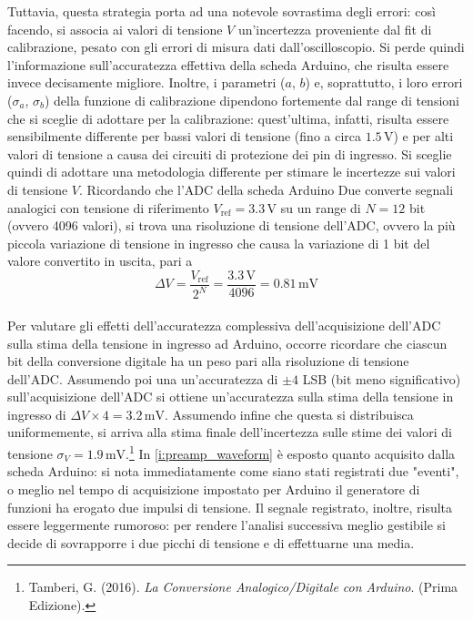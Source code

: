 \documentclass[a4paper,11pt]{article} %
\begin{document}
Tuttavia, questa strategia porta ad una notevole sovrastima degli errori: così facendo, si associa ai valori di tensione
$V$ un'incertezza proveniente dal fit di calibrazione, pesato con gli errori di misura dati dall'oscilloscopio. Si perde
quindi l'informazione sull'accuratezza effettiva della scheda Arduino, che risulta essere invece decisamente migliore.
Inoltre, i parametri ($a$, $b$) e, soprattutto, i loro errori ($\sigma_a$, $\sigma_b$) della funzione di calibrazione
dipendono fortemente dal range di tensioni che si sceglie di adottare per la calibrazione: quest'ultima, infatti,
risulta essere sensibilmente differente per bassi valori di tensione (fino a circa $1.5\,\si{\volt}$) e per alti valori
di tensione a causa dei circuiti di protezione dei pin di ingresso. Si sceglie quindi di adottare una metodologia
differente per stimare le incertezze sui valori di tensione $V$. Ricordando che l'ADC della scheda Arduino Due converte
segnali analogici con tensione di riferimento $V_{\text{ref}}=3.3\,\si{\volt}$ su un range di $N = 12$ bit (ovvero 4096
valori), si trova una risoluzione di tensione dell’ADC, ovvero la più piccola variazione di tensione in ingresso che
causa la variazione di 1 bit del valore convertito in uscita, pari a 
\begin{equation}
	\Delta V = \frac{V_{\text{ref}}}{2^N} = \frac{3.3\,\si{\volt}}{4096} = 0.81 \,\si{\milli\volt}
\end{equation}\\
Per valutare gli effetti dell'accuratezza complessiva dell’acquisizione dell’ADC sulla stima della tensione in ingresso
ad Arduino, occorre ricordare che ciascun bit della conversione digitale ha un peso pari alla risoluzione di tensione
dell’ADC. Assumendo poi una un'accuratezza di $\pm 4$ LSB (bit meno significativo) sull’acquisizione dell’ADC si ottiene
un'accuratezza sulla stima della tensione in ingresso di $\Delta V \times 4 = 3.2 \,\si{\milli\volt}$. Assumendo infine
che questa si distribuisca uniformemente, si arriva alla stima finale dell'incertezza sulle stime dei valori di tensione
$\sigma_{V} = 1.9 \,\si{\milli\volt}$.\footnote{Tamberi, G. (2016). \textit{La Conversione Analogico/Digitale con
Arduino}. (Prima Edizione).} In \autoref{i:preamp_waveform} è esposto quanto acquisito dalla scheda Arduino: si nota
immediatamente come siano stati registrati due "eventi", o meglio nel tempo di acquisizione impostato per Arduino il
generatore di funzioni ha erogato due impulsi di tensione. Il segnale registrato, inoltre, risulta essere leggermente
rumoroso: per rendere l'analisi successiva meglio gestibile si decide di sovrapporre i due picchi di tensione e di
effettuarne una media. 
\end{document}

